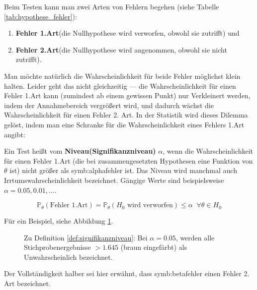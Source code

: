 Beim Testen kann man zwei Arten von Fehlern begehen (siehe Tabelle \ref{tab:hypothese_fehler}): 
\begin{enumerate}[1.)]
    \item \textbf{Fehler 1.Art}(die Nullhypothese wird verworfen, obwohl sie zutrifft) und 
    \item \textbf{Fehler 2.Art}(die Nullhypothese wird angenommen, obwohl sie nicht zutrifft). 
\end{enumerate}
Man möchte natürlich die Wahrscheinlichkeit für beide Fehler möglichst
klein halten. Leider geht das nicht gleichzeitig --- die Wahrscheinlichkeit
für einen Fehler 1.Art kann (zumindest ab einem gewissen Punkt) nur
Verkleinert werden, indem der Annahmebereich vergrößert wird, und dadurch
wächst die Wahrscheinlichkeit für einen Fehler 2. Art. 
In der Statistik wird dieses Dilemma gelöst, indem man eine Schranke
für die Wahrscheinlichkeit eines Fehlers 1.Art angibt:

\begin{definition}\label{def:signifikanzniveau}
Ein Test heißt vom \textbf{Niveau(Signifikanzniveau)} $\alpha$, wenn die Wahrscheinlichkeit für
einen Fehler 1.Art (die bei zusammengesetzten Hypothesen eine Funktion
von $\theta$ ist) nicht größer als \gls{symb:alphafehler} ist. Das Niveau wird manchmal auch Irrtumswahrscheinlichkeit bezeichnet. Gängige Werte sind beispielsweise $\alpha=0.05, 0.01,...$.

\[\mathbb{P}_\theta(\text{Fehler 1.Art})=\mathbb{P}_\theta(\text{$H_0$ wird verworfen})\leq \alpha\;\;\forall \theta\in H_0\]

Für ein Beispiel, siehe Abbildung \ref{fig:sinifikanzniveau}.
\end{definition}
\begin{figure}
    \centering
    \begin{tikzpicture}
    \end{tikzpicture}
    \caption{Zu Definition \ref{def:signifikanzniveau}: Bei $\alpha=0.05$, werden alle Stichprobenergebnisse ${>1.645}$ (braun eingefärbt) als Unwahrscheinlich bezeichnet.}
    \label{fig:sinifikanzniveau}
\end{figure}
Der Vollständigkeit halber sei hier erwähnt, dass \gls{symb:betafehler} einen Fehler 2. Art bezeichnet.\\


